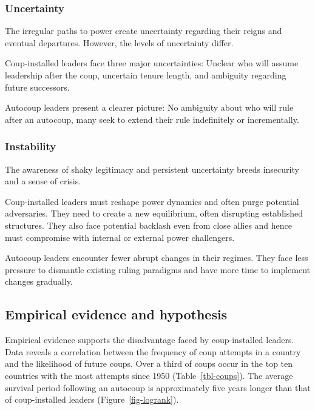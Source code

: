 \documentclass[
  12pt,
]{report}
\begin{document}
\subsubsection*{Uncertainty}\label{uncertainty}

The irregular paths to power create uncertainty regarding their reigns
and eventual departures. However, the levels of uncertainty differ.

Coup-installed leaders face three major uncertainties: Unclear who will
assume leadership after the coup, uncertain tenure length, and ambiguity
regarding future successors.

Autocoup leaders present a clearer picture: No ambiguity about who will
rule after an autocoup, many seek to extend their rule indefinitely or
incrementally.

\subsubsection*{Instability}\label{instability}

The awareness of shaky legitimacy and persistent uncertainty breeds
insecurity and a sense of crisis.

Coup-installed leaders must reshape power dynamics and often purge
potential adversaries. They need to create a new equilibrium, often
disrupting established structures. They also face potential backlash
even from close allies and hence must compromise with internal or
external power challengers.

Autocoup leaders encounter fewer abrupt changes in their regimes. They
face less pressure to dismantle existing ruling paradigms and have more
time to implement changes gradually.

\subsection{Empirical evidence and
hypothesis}\label{empirical-evidence-and-hypothesis}

Empirical evidence supports the disadvantage faced by coup-installed
leaders. Data reveals a correlation between the frequency of coup
attempts in a country and the likelihood of future coups. Over a third
of coups occur in the top ten countries with the most attempts since
1950 (Table~\ref{tbl-coups}). The average survival period following an
autocoup is approximately five years longer than that of coup-installed
leaders (Figure~\ref{fig-logrank}).
\end{document}
